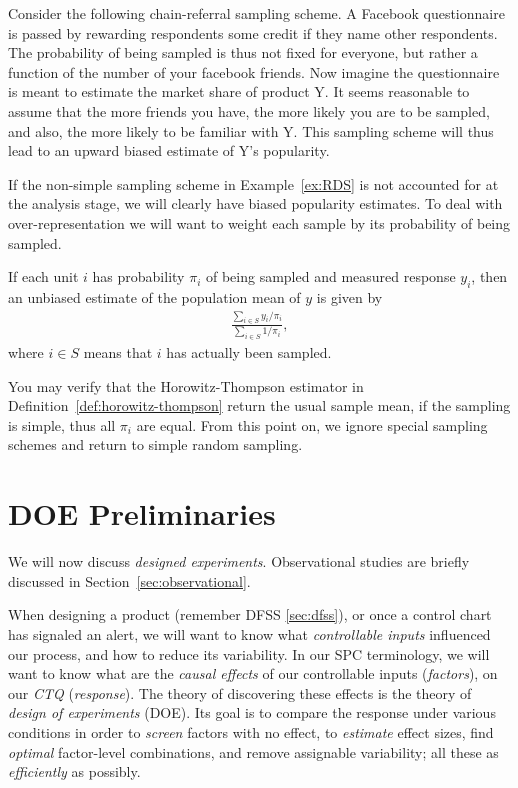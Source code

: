 \begin{example}
	\label{ex:RDS}
	Consider the following chain-referral sampling scheme. 
	A Facebook questionnaire is passed by rewarding respondents some credit if they name other respondents.
	The probability of being sampled is thus not fixed for everyone, but rather a function of the number of your facebook friends.  
	Now imagine the questionnaire is meant to estimate the market share of product Y.
	It seems reasonable to assume that the more friends you have, the more likely you are to be sampled, and also, the more likely to be familiar with Y. 
	This sampling scheme will thus lead to an upward biased estimate of Y's popularity.
\end{example}

If the non-simple sampling scheme in Example~\ref{ex:RDS} is not accounted for at the analysis stage, we will clearly have biased popularity estimates. 
To deal with over-representation we will want to weight each sample by its probability of being sampled.
\begin{definition}
	\label{def:horowitz-thompson}
	If each unit $i$ has probability $\pi_i$ of being sampled and measured response $y_i$, then an unbiased estimate of the population mean of $y$ is given by 
	\begin{align}
	\frac{\sum_{i \in S} y_i/\pi_i}{\sum_{i \in S} 1/\pi_i},
	\end{align}
	where $i \in S$ means that $i$ has actually been sampled. 
\end{definition}
You may verify that the Horowitz-Thompson estimator in Definition~\ref{def:horowitz-thompson} return the usual sample mean, if the sampling is simple, thus all $\pi_i$ are equal. 
From this point on, we ignore special sampling schemes and return to simple random sampling. 





\section{DOE Preliminaries}
\label{sec:DOE_preliminaries}

We will now discuss \emph{designed experiments}. 
Observational studies are briefly discussed in Section~\ref{sec:observational}.

When designing a product (remember DFSS \ref{sec:dfss}), or once a control chart has signaled an alert, we will want to know what \emph{controllable inputs} influenced our process, and how to reduce its variability.
In our SPC terminology, we will want to know what are the \emph{causal effects} of our controllable inputs (\emph{factors}), on our \emph{CTQ} (\emph{response}). 
The theory of discovering these effects is the theory of \emph{design of experiments} (DOE).
Its goal is to compare the response under various conditions in order to \emph{screen} factors with no effect, 
to \emph{estimate} effect sizes, 
find \emph{optimal} factor-level combinations, 
and remove assignable variability; 
all these as \emph{efficiently} as possibly.


